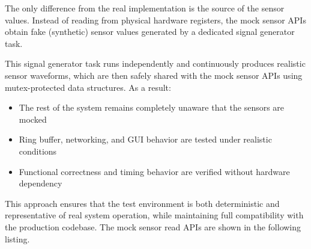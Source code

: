 \documentclass{article}
\begin{document}
The only difference from the real implementation is the source of the sensor 
values. Instead of reading from physical hardware registers, the mock sensor APIs 
obtain fake (synthetic) sensor values generated by a dedicated signal generator 
task.

This signal generator task runs independently and continuously produces realistic 
sensor waveforms, which are then safely shared with the mock sensor APIs using 
mutex-protected data structures. As a result:

\begin{itemize}
    \item The rest of the system remains completely unaware that the sensors are mocked
    \item Ring buffer, networking, and GUI behavior are tested under realistic conditions
    \item Functional correctness and timing behavior are verified without hardware dependency
\end{itemize}

This approach ensures that the test environment is both deterministic and 
representative of real system operation, while maintaining full compatibility with 
the production codebase. The mock sensor read APIs are shown in the following listing.
\end{document}
